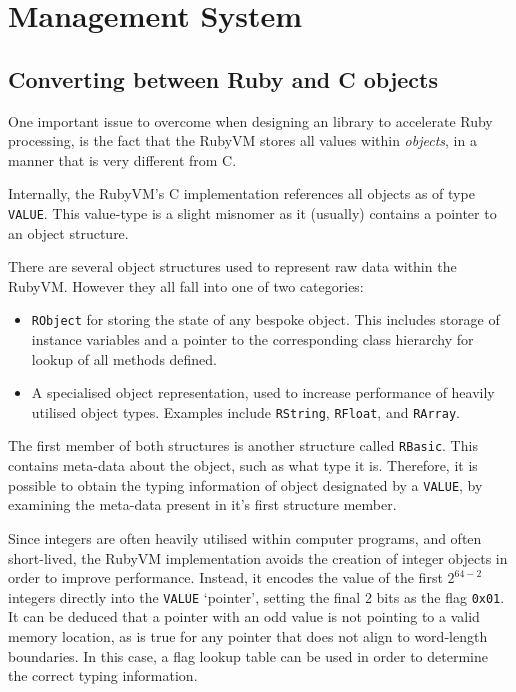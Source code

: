 \section{Management System}

\subsection{Converting between Ruby and C objects}
One important issue to overcome when designing an library to accelerate Ruby processing, is the fact that the RubyVM stores all values within \emph{objects}, in a manner that is very different from C.

Internally, the RubyVM's C implementation references all objects as of type \verb|VALUE|. This value-type is a slight misnomer as it (usually) contains a pointer to an object structure.

There are several object structures used to represent raw data within the RubyVM. However they all fall into one of two categories:
\begin{itemize}
     \item \verb|RObject| for storing the state of any bespoke object. This includes storage of instance variables and a pointer to the corresponding class hierarchy for lookup of all methods defined.
     \item A specialised object representation, used to increase performance of heavily utilised object types. Examples include \verb|RString|, \verb|RFloat|, and \verb|RArray|.
\end{itemize}

The first member of both structures is another structure called \verb|RBasic|. This contains meta-data about the object, such as what type it is. Therefore, it is possible to obtain the typing information of object designated by a \verb|VALUE|, by examining the meta-data present in it's first structure member.

Since integers are often heavily utilised within computer programs, and often short-lived, the RubyVM implementation avoids the creation of integer objects in order to improve performance.
Instead, it encodes the value of the first $2^{64 - 2}$ integers directly into the \verb|VALUE| `pointer', setting the final 2 bits as the flag \verb|0x01|.
It can be deduced that a pointer with an odd value is not pointing to a valid memory location, as is true for any pointer that does not align to word-length boundaries. In this case, a flag lookup table can be used in order to determine the correct typing information.

